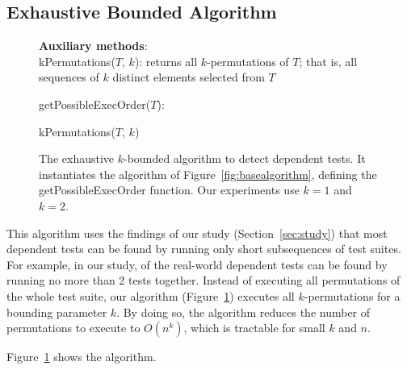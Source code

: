 

\subsection{Exhaustive Bounded Algorithm}
\label{sec:basic}

\begin{figure}[t]
\textbf{Auxiliary methods}:\\
kPermutations($T$, $k$): returns all $k$-permutations of $T$; that is, all
sequences of $k$ distinct elements selected from $T$

\medskip

getPossibleExecOrder($T$):\\
\vspace{-5mm}
\begin{algorithmic}[1]
\RETURN kPermutations($T$, $k$)
\end{algorithmic}

\vspace{-3mm}
\caption {The exhaustive $k$-bounded algorithm to detect dependent tests.
It instantiates the algorithm of Figure~\ref{fig:basealgorithm}, defining the
getPossibleExecOrder function.
Our experiments use $k=1$ and $k=2$.
} 
\label{fig:exhaustivealgorithm}
\end{figure}



This algorithm uses the findings of our study
(Section~\ref{sec:study})
that most dependent tests can be found by running only short
subsequences of test suites. For example,
in our study, \pertange of the real-world dependent tests
can be found by running no more than 2 tests together.
Instead of executing all permutations of the
whole test suite, our algorithm (Figure~\ref{fig:exhaustivealgorithm})
executes all $k$-permutations for a bounding
parameter $k$.
By doing so, the algorithm reduces
the number of permutations to execute
to $O(n^k)$, which is tractable for small $k$ and $n$. 


Figure~\ref{fig:exhaustivealgorithm} shows the algorithm.


